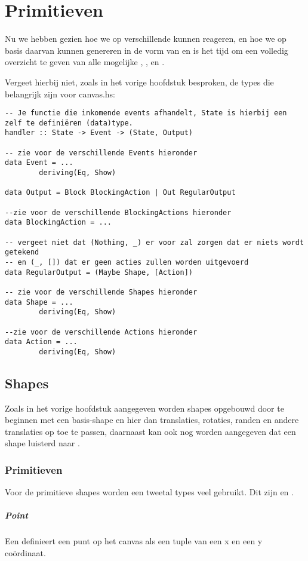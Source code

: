 \section{Primitieven}
Nu we hebben gezien hoe we op verschillende \events kunnen reageren, en hoe we op basis daarvan  kunnen genereren in de vorm van \shapes en \actions is het tijd om een volledig overzicht te geven van alle mogelijke \events , \shapes , en \actions.

Vergeet hierbij niet, zoals in het vorige hoofdstuk besproken, de types die belangrijk zijn voor canvas.hs:

\begin{lstlisting}
-- Je functie die inkomende events afhandelt, State is hierbij een zelf te definiëren (data)type.
handler :: State -> Event -> (State, Output)

-- zie voor de verschillende Events hieronder
data Event = ...
		deriving(Eq, Show)

data Output = Block BlockingAction | Out RegularOutput

--zie voor de verschillende BlockingActions hieronder
data BlockingAction = ... 

-- vergeet niet dat (Nothing, _) er voor zal zorgen dat er niets wordt getekend 
-- en (_, []) dat er geen acties zullen worden uitgevoerd
data RegularOutput = (Maybe Shape, [Action])

-- zie voor de verschillende Shapes hieronder
data Shape = ...
		deriving(Eq, Show)

--zie voor de verschillende Actions hieronder
data Action = ...
		deriving(Eq, Show)
\end{lstlisting}

\subsection{Shapes}
Zoals in het vorige hoofdstuk aangegeven worden shapes opgebouwd door te beginnen met een basis-shape en hier dan translaties, rotaties, randen en andere translaties op toe te passen, daarnaast kan ook nog worden aangegeven dat een shape luisterd naar \events.

\subsubsection{Primitieven}
Voor de primitieve shapes worden een tweetal types veel gebruikt. Dit zijn  en . 

\subparagraph{Point}
Een  definieert een punt op het canvas als een tuple van een x en een y coördinaat. 

